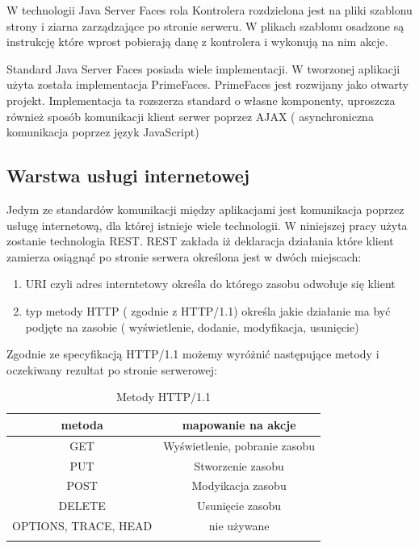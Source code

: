 W technologii Java Server Faces rola Kontrolera rozdzielona jest na pliki szablonu strony i ziarna zarządzające po stronie serweru. W plikach szablonu osadzone są instrukcję które wprost pobierają danę z kontrolera i wykonują na nim akcje.

Standard Java Server Faces posiada wiele implementacji. W tworzonej aplikacji użyta została implementacja PrimeFaces\cite{primeFaces}. PrimeFaces jest rozwijany jako otwarty projekt. Implementacja ta rozszerza standard o własne komponenty, uproszcza również sposób komunikacji klient serwer poprzez AJAX ( asynchroniczna komunikacja poprzez język JavaScript)

\subsection{Warstwa usługi internetowej}



Jedym ze standardów komunikacji między aplikacjami jest komunikacja poprzez usługę internetową, dla której istnieje wiele technologii. W niniejszej pracy użyta zostanie technologia REST. REST zakłada iż deklaracja działania które klient zamierza osiągnąć po stronie serwera określona jest w dwóch miejscach:
\begin{enumerate}
  \item URI czyli adres interntetowy określa do którego zasobu odwołuje się klient
  \item  typ metody HTTP ( zgodnie z HTTP/1.1) określa jakie działanie ma być podjęte na zasobie ( wyświetlenie, dodanie, modyfikacja, usunięcie)
\end{enumerate}

Zgodnie ze specyfikacją HTTP/1.1 możemy wyróżnić następujące metody i oczekiwany rezultat po stronie serwerowej:

\renewcommand\multirowsetup{\centering\arraybackslash}
\begin{longtable}{|c|c|}
\hline
\textbf{metoda} & \textbf{mapowanie na akcje} \\ \hline
GET & Wyświetlenie, pobranie zasobu \\ \hline
PUT & Stworzenie zasobu \\ \hline
POST & Modyikacja zasobu \\ \hline
DELETE & Usunięcie zasobu \\ \hline
OPTIONS, TRACE, HEAD & nie używane \\ \hline

\caption{Metody HTTP/1.1 \cite{http}}
\end{longtable}


